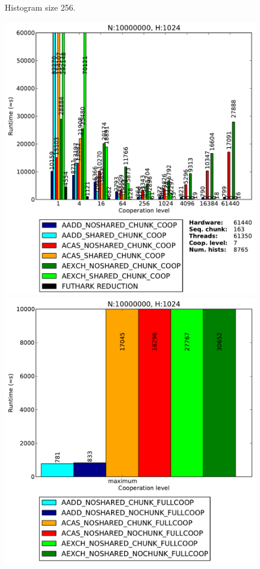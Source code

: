 \begin{figure}
\begin{minipage}{0.5\textwidth}
\end{minipage}
\caption{Histogram size 256.}
\label{fig:one}
\end{figure}
%

%
\begin{figure}
\begin{minipage}{0.5\textwidth}
\includegraphics[scale=0.35]{input/content/figures/experiment/hist-1024}
\end{minipage}
\begin{minipage}{0.5\textwidth}
\includegraphics[scale=0.35]{input/content/figures/experiment/hist-1024-full}

\end{minipage}
\end{figure}
